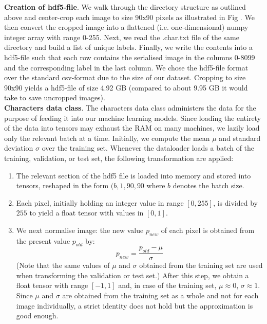 \documentclass[british,12p]{article}
\begin{document}
    	
    	\textbf{Creation of hdf5-file}. We walk through the directory structure as outlined above and center-crop each image to size 90x90 pixels as illustrated in Fig . We then convert the cropped image into a flattened (i.e. one-dimensional) numpy integer array with range 0-255. Next, we read the .char.txt file of the same directory and build a list of unique labels. Finally, we write the contents into a hdf5-file such that each row contains the serialised image in the columns 0-8099 and the corresponding label in the last column. We chose the hdf5-file format over the standard csv-format due to the size of our dataset. Cropping to size 90x90 yields a hdf5-file of size 4.92 GB (compared to about 9.95 GB it would take to save uncropped images).\\
    	
    	
    	\textbf{Characters data class}. The characters data class administers the data for the purpose of feeding it into our machine learning models. Since loading the entirety of the data into tensors may exhaust the RAM on many machines, we lazily load only the relevant batch at a time. Initially, we compute the mean $\mu$ and standard deviation $\sigma$ over the training set. Whenever the dataloader loads a batch of the training, validation, or test set, the following transformation are applied:
    	\begin{enumerate}
    		\item The relevant section of the hdf5 file is loaded into memory and stored into tensors, reshaped in the form $(b, 1, 90, 90$ where $b$ denotes the batch size.
    		\item Each pixel, initially holding an integer value in range $[0, 255]$, is divided by $255$ to yield a float tensor with values in $[0, 1]$.
    		\item We next normalise image: the new value $p_{new}$ of each pixel is obtained from the present value $p_{old}$ by: $$ p_{new} = \frac{p_{old} - \mu}{\sigma}$$ (Note that the same values of $\mu$ and $\sigma$  obtained from the training set are used when transforming the validation or test set.) After this step, we obtain a float tensor with range $[-1, 1]$ and, in case of the training set, $\mu \approx 0$, $\sigma \approx 1$. Since $\mu$ and $\sigma$ are obtained from the training set as a whole and not for each image individually, a strict identity does not hold but the approximation is good enough.
    	\end{enumerate}
    	
\end{document}
